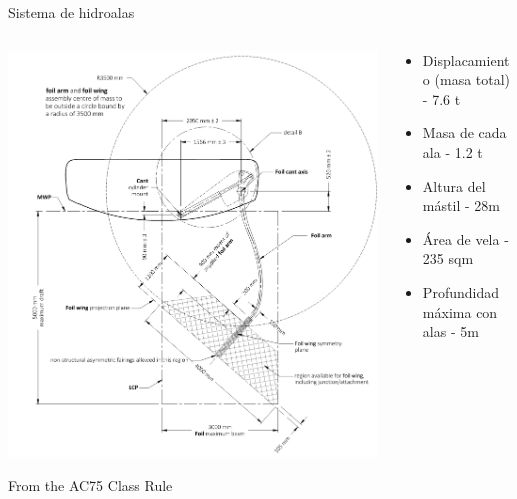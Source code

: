 \documentclass[presentation,aspectratio=169]{beamer}
\begin{document}
\begin{frame}[label={sec:org254a290}]{Sistema de hidroalas}
\begin{columns}
\begin{column}{0.5\columnwidth}
\begin{center}
\includegraphics[height=0.8\textheight]{../../figures/AC75-class-foil.png}
\end{center}

{\footnotesize From the AC75 Class Rule}
\end{column}
\begin{column}{0.5\columnwidth}
\begin{itemize}
\item Displacamiento (masa total) - 7.6 t
\item Masa de cada ala - 1.2 t
\item Altura del mástil - 28m
\item Área de vela - 235 sqm
\item Profundidad máxima con alas - 5m
\end{itemize}
\end{column}
\end{columns}
\end{frame}
\end{document}
